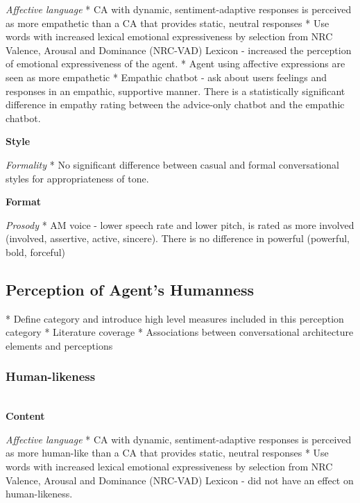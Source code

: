 \documentclass[sigconf,screen,review, anonymous]{acmart}
\newcommand{\cmt}[1]{}%
\begin{document}
\textit{Affective language}
* CA with dynamic, sentiment-adaptive responses is perceived as more empathetic than a CA that provides static, neutral responses \cite{diederich2019emulating}\cmt{[25]}
* Use words with increased lexical emotional expressiveness by selection from NRC Valence, Arousal and Dominance (NRC-VAD) Lexicon - increased the perception of emotional expressiveness of the agent. \cite{zhu2022effects}\cmt{[26]}
* Agent using affective expressions are seen as more empathetic \cite{yang2017perceived}\cmt{[44]}
* Empathic chatbot - ask about users feelings and responses in an empathic, supportive manner. There is a statistically significant difference in empathy rating between the advice-only chatbot and the empathic chatbot. \cite{daher2020empathic}\cmt{[58]}

%
\textbf{Style}

\textit{Formality}
* No significant difference between casual and formal conversational styles for appropriateness of tone. \cite{cox2022does}\cmt{[27]}

%
\textbf{Format}

\textit{Prosody}
* AM voice - lower speech rate and lower pitch, is rated as more involved (involved, assertive, active, sincere). There is no difference in powerful (powerful, bold, forceful) \cite{dubiel2020persuasive}\cmt{[60]}


\subsection{Perception of Agent's Humanness}

* Define category and introduce high level measures included in this perception category
* Literature coverage
* Associations between conversational architecture elements and perceptions

\subsubsection{Human-likeness \nopunct}
\hfill\\

\textbf{Content}

\textit{Affective language}
* CA with dynamic, sentiment-adaptive responses is perceived as more human-like than a CA that provides static, neutral responses \cite{diederich2019emulating}\cmt{[25]}
* Use words with increased lexical emotional expressiveness by selection from NRC Valence, Arousal and Dominance (NRC-VAD) Lexicon - did not have an effect on human-likeness. \cite{zhu2022effects}\cmt{[26]}
\end{document}
